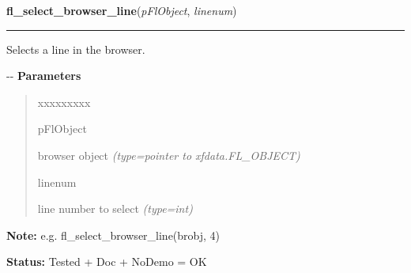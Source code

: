     \vspace{0.5ex}

\hspace{.8\funcindent}\begin{boxedminipage}{\funcwidth}

    \raggedright \textbf{fl\_select\_browser\_line}(\textit{pFlObject}, \textit{linenum})

    \vspace{-1.5ex}

    \rule{\textwidth}{0.5\fboxrule}
\setlength{\parskip}{2ex}

Selects a line in the browser.

-{}-
\setlength{\parskip}{1ex}
      \textbf{Parameters}
      \vspace{-1ex}

      \begin{quote}
        \begin{Ventry}{xxxxxxxxx}

          \item[pFlObject]


browser object
            {\it (type=pointer to xfdata.FL\_OBJECT)}

          \item[linenum]


line number to select
            {\it (type=int)}

        \end{Ventry}

      \end{quote}

\textbf{Note:} 
e.g. fl\_select\_browser\_line(brobj, 4)


\textbf{Status:} 
Tested + Doc + NoDemo = OK


    \end{boxedminipage}

    \label{xformslib:flbrowser:fl_deselect_browser_line}

    \vspace{0.5ex}


